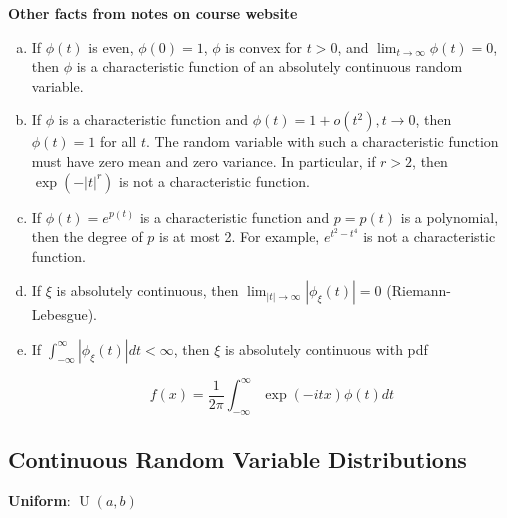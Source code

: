 \begin{theorem}

\textbf{Other facts from notes on course website}

\begin{enumerate}[(a)]

\item If \(\phi(t)\) is even, \(\phi(0) = 1\), \(\phi\) is convex for \(t > 0\), and \(\lim_{t \to \infty} \phi(t) = 0\), then \(\phi\) is a characteristic function of an absolutely continuous random variable.

\item If \(\phi\) is a characteristic function and \(\phi(t) = 1 + o(t^2), t \to 0\), then \(\phi(t) = 1\) for all \(t\). The random variable with such a characteristic function must have zero mean and zero variance. In particular, if \(r > 2\), then \(\exp(-\left|t\right|^r)\) is not a characteristic function.

\item If \(\phi(t) = e^{p(t)}\) is a characteristic function and \(p = p(t)\) is a polynomial, then the degree of \(p\) is at most 2. For example, \(e^{t^2 - t^4}\) is not a characteristic function.

\item If \(\xi\) is absolutely continuous, then \(\lim_{\left|t \right| \to \infty} \left| \phi_{\xi}(t) \right| = 0\) (Riemann-Lebesgue).

\item If \(\int_{-\infty}^\infty \left| \phi_{\xi}(t) \right| dt < \infty\), then \(\xi\) is absolutely continuous with pdf 

\[
f(x) = \frac{1}{2\pi} \int_{-\infty}^\infty \exp(-itx) \phi(t) dt
\]

\end{enumerate}
\end{theorem}

\subsection{Continuous Random Variable Distributions}


\textbf{Uniform}: \(\operatorname{U}(a, b)\)

